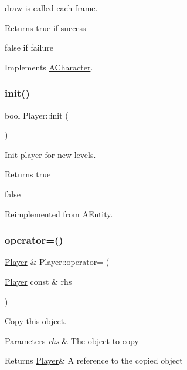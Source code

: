draw is called each frame. 

\begin{DoxyReturn}{Returns}
true if success 

false if failure 
\end{DoxyReturn}


Implements \hyperlink{class_a_character_af223d3c9dbd3143daf62e9834bd30e3d}{A\+Character}.

\mbox{\label{class_player_afcf86538719baa2f5c81d0b90263c41a}} 
\subsubsection{\texorpdfstring{init()}{init()}}
{\footnotesize\ttfamily bool Player\+::init (\begin{DoxyParamCaption}{ }\end{DoxyParamCaption})\hspace{0.3cm}{\ttfamily [virtual]}}



Init player for new levels. 

\begin{DoxyReturn}{Returns}
true 

false 
\end{DoxyReturn}


Reimplemented from \hyperlink{class_a_entity_a450361b684fa02e4ffe0ba406b8e3b30}{A\+Entity}.

\mbox{\label{class_player_a32a02cfee10a8ba8ccfa4cd0244cb42f}} 
\subsubsection{\texorpdfstring{operator=()}{operator=()}}
{\footnotesize\ttfamily \hyperlink{class_player}{Player} \& Player\+::operator= (\begin{DoxyParamCaption}\item[{\hyperlink{class_player}{Player} const \&}]{rhs }\end{DoxyParamCaption})}



Copy this object. 


\begin{DoxyParams}{Parameters}
{\em rhs} & The object to copy \\
\hline
\end{DoxyParams}
\begin{DoxyReturn}{Returns}
\hyperlink{class_player}{Player}\& A reference to the copied object 
\end{DoxyReturn}
\mbox{\label{class_player_acfee156e2e7cdcb474a1f34fec5bfa6d}} 
